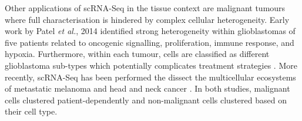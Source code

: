 Other applications of scRNA-Seq in the tissue context are malignant tumours where full characterisation is hindered by complex cellular heterogeneity. Early work by Patel \emph{et al.}, 2014 identified strong heterogeneity within glioblastomas of five patients related to oncogenic signalling, proliferation, immune response, and hypoxia. Furthermore, within each tumour, cells are classified as different glioblastoma sub-types which potentially complicates treatment strategies \citep{Patel2014}. More recently, scRNA-Seq has been performed the dissect the multicellular ecosystems of metastatic melanoma \citep{Tirosh2016} and head and neck cancer \citep{Puram2017}. In both studies, malignant cells clustered patient-dependently and non-malignant cells clustered based on their cell type. \\

